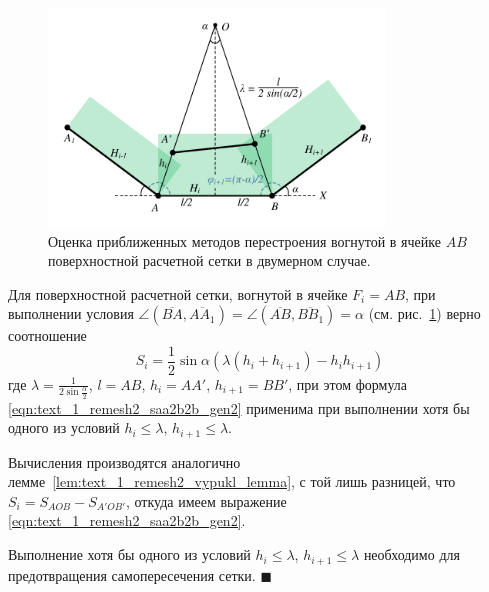 \begin{figure}[ht]
\centering
\includegraphics[width=0.8\textwidth]{fig/2dr_theoretical_concave.pdf}
\singlespacing
{}\caption{Оценка приближенных методов перестроения вогнутой в ячейке $AB$ поверхностной расчетной сетки в двумерном случае.}
\label{fig:text_1_remesh_2d_theoretical_concave}
\end{figure}

\begin{lemma}
Для поверхностной расчетной сетки, вогнутой в ячейке $F_i = AB$, при выполнении условия $\angle (\overline{BA}, \overline{AA_1}) = \angle (\overline{AB}, \overline{BB_1}) = \alpha$ (см. рис.~\ref{fig:text_1_remesh_2d_theoretical_concave}) верно соотношение
\begin{equation}\label{eqn:text_1_remesh2_saa2b2b_gen2}
S_i = \frac{1}{2} \sin \alpha \left( \lambda(h_i + h_{i+1}) - h_ih_{i+1} \right)
\end{equation}
где $\lambda = \frac{1}{2 \sin \frac{\alpha}{2}}$, $l = AB$, $h_i = AA'$, $h_{i + 1} = BB'$, при этом формула \eqref{eqn:text_1_remesh2_saa2b2b_gen2} применима при выполнении хотя бы одного из условий $h_i \le \lambda$, $h_{i+1} \le \lambda$.
\end{lemma}

Вычисления производятся аналогично лемме~\ref{lem:text_1_remesh2_vypukl_lemma}, с той лишь разницей, что $S_i = S_{AOB} - S_{A'OB'}$, откуда имеем выражение \eqref{eqn:text_1_remesh2_saa2b2b_gen2}.

Выполнение хотя бы одного из условий $h_i \le \lambda$, $h_{i+1} \le \lambda$ необходимо для предотвращения самопересечения сетки.
$\blacksquare$\\

